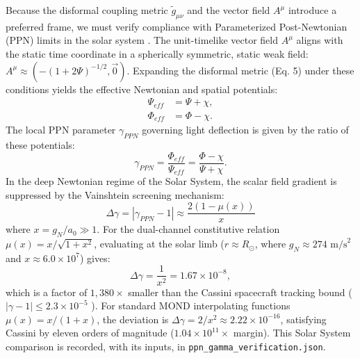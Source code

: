 \documentclass[twocolumn,amsmath,amssymb,floatfix]{article}
\begin{document}
Because the disformal coupling metric $\tilde{g}_{\mu\nu}$ and the vector field $A^\mu$ introduce a preferred frame, we must verify compliance with Parameterized Post-Newtonian (PPN) limits in the solar system \citep{Will2014}. The unit-timelike vector field $A^\mu$ aligns with the static time coordinate in a spherically symmetric, static weak field: $A^\mu \approx (-(1+2\Psi)^{-1/2}, \vec{0})$. Expanding the disformal metric (Eq. 5) under these conditions yields the effective Newtonian and spatial potentials:
\begin{align}
    \Psi_{eff} &= \Psi + \chi, \\
    \Phi_{eff} &= \Phi - \chi.
\end{align}
The local PPN parameter $\gamma_{PPN}$ governing light deflection is given by the ratio of these potentials:
\begin{equation}
    \gamma_{PPN} = \frac{\Phi_{eff}}{\Psi_{eff}} = \frac{\Phi - \chi}{\Psi + \chi}.
\end{equation}
In the deep Newtonian regime of the Solar System, the scalar field gradient is suppressed by the Vainshtein screening mechanism:
\begin{equation}
    \Delta \gamma = | \gamma_{PPN} - 1 | \approx \frac{2 (1 - \mu(x))}{x}
\end{equation}
where $x = g_N / a_0 \gg 1$. For the dual-channel constitutive relation $\mu(x) = x / \sqrt{1+x^2}$, evaluating at the solar limb ($r \approx R_\odot$, where $g_N \approx 274\text{ m/s}^2$ and $x \approx 6.0 \times 10^7$) gives:
\begin{equation}
    \Delta \gamma = \frac{1}{x^2} = 1.67 \times 10^{-8},
\end{equation}
which is a factor of $1,380\times$ smaller than the Cassini spacecraft tracking bound ($|\gamma - 1| \le 2.3 \times 10^{-5}$ \citep{Bertotti2003}). For standard MOND interpolating functions $\mu(x) = x / (1+x)$, the deviation is $\Delta \gamma = 2/x^2 \approx 2.22 \times 10^{-16}$, satisfying Cassini by eleven orders of magnitude ($1.04 \times 10^{11}\times$ margin). This Solar System comparison is recorded, with its inputs, in \texttt{ppn\_gamma\_verification.json}.
\end{document}
